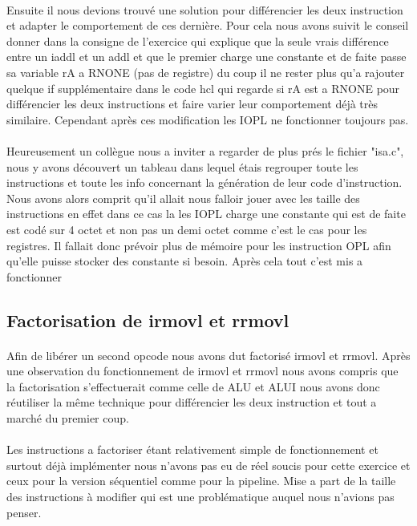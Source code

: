 \documentclass[12pt]{article}
\begin{document}
\paragraph{}Ensuite il nous devions trouvé une solution pour différencier les deux instruction
et adapter le comportement de ces dernière. Pour cela nous avons suivit le conseil
donner dans la consigne de l’exercice qui explique que la seule vrais différence entre un iaddl et un addl et que le premier charge une constante et de faite passe sa variable rA a RNONE (pas de registre) du coup il ne rester plus qu'a rajouter quelque if supplémentaire dans le code hcl qui regarde si rA est a RNONE pour différencier les deux instructions et faire varier leur comportement déjà très similaire. Cependant après ces modification les IOPL ne fonctionner toujours pas.

\paragraph{}Heureusement un collègue nous a inviter a regarder de plus prés le fichier "isa.c", nous y avons découvert un tableau dans lequel étais regrouper toute les instructions
et toute les info concernant la génération de leur code d'instruction. Nous avons alors comprit qu'il allait nous falloir jouer avec les taille des instructions en
effet dans ce cas la les IOPL charge une constante qui est de faite est codé sur
4 octet et non pas un demi octet comme c’est le cas pour les registres. Il fallait donc prévoir plus de mémoire pour les instruction OPL afin qu'elle puisse stocker des constante si besoin. Après cela tout c'est mis a fonctionner


\subsection{Factorisation de irmovl et rrmovl}
\paragraph{}Afin de libérer un second opcode nous avons dut factorisé irmovl et rrmovl.
Après une observation du fonctionnement de irmovl et rrmovl nous avons compris que la factorisation s’effectuerait comme celle de ALU et ALUI nous avons donc réutiliser la même technique pour différencier les deux instruction et tout a marché du premier coup.

\paragraph{}Les instructions a factoriser étant relativement simple de fonctionnement et surtout déjà implémenter nous n'avons pas eu de réel soucis pour cette exercice et ceux pour la version séquentiel comme pour la pipeline. Mise a part de la taille des instructions à modifier qui est une problématique auquel nous n'avions pas penser.
\end{document}
